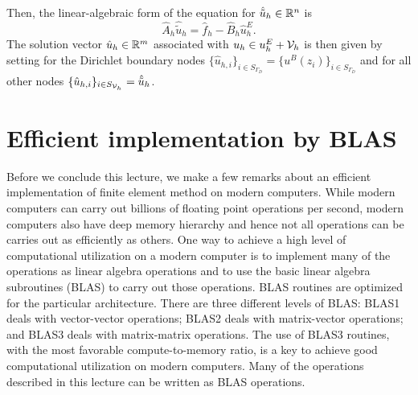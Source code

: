 Then, the linear-algebraic form of the equation for $\hat{\tilde u}_h \in \mathbb{R}^n$ is
\begin{equation*}
  \hat A_h \hat{\tilde u}_h = \hat f_h - \hat B_h \hat u^E_h.
\end{equation*}
The solution vector $\hat u_h \in \mathbb{R}^m$ associated with $u_h \in u^E_h + \mathcal{V}_h$ is then given by setting for the Dirichlet boundary nodes $\{ \hat u_{h,i} \}_{i \in S_{\Gamma_D}} = \{ u^B(z_i) \}_{i \in S_{\Gamma_D}}$ and for all other nodes $\{ \hat u_{h,i} \}_{i \in S_{\mathcal{V}_h}} = \hat{\tilde u}_h$.

\section{Efficient implementation by BLAS}
\label{sec:fe_impl_blas}
Before we conclude this lecture, we make a few remarks about an efficient implementation of finite element method on modern computers.  While modern computers can carry out billions of floating point operations per second, modern computers also have deep memory hierarchy and hence not all operations can be carries out as efficiently as others.  One way to achieve a high level of computational utilization on a modern computer is to implement many of the operations as linear algebra operations and to use the basic linear algebra subroutines (BLAS) to carry out those operations.  BLAS routines are optimized for the particular architecture.  There are three different levels of BLAS: BLAS1 deals with vector-vector operations; BLAS2 deals with matrix-vector operations; and BLAS3 deals with matrix-matrix operations. The use of BLAS3 routines, with the most favorable compute-to-memory ratio, is a key to achieve good computational utilization on modern computers.  Many of the operations described in this lecture can be written as BLAS operations.

